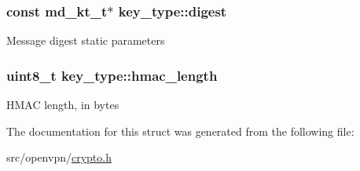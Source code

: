 \subsubsection[{digest}]{\setlength{\rightskip}{0pt plus 5cm}const {\bf md\+\_\+kt\+\_\+t}$\ast$ key\+\_\+type\+::digest}\label{structkey__type_a496ad3263017e1eca30ec7f490a8011e}
Message digest static parameters \hypertarget{structkey__type_a0714213fa1e02f00924a2c85deb53caf}{}
\subsubsection[{hmac\+\_\+length}]{\setlength{\rightskip}{0pt plus 5cm}uint8\+\_\+t key\+\_\+type\+::hmac\+\_\+length}\label{structkey__type_a0714213fa1e02f00924a2c85deb53caf}
H\+M\+A\+C length, in bytes 

The documentation for this struct was generated from the following file\+:\begin{DoxyCompactItemize}
\item 
src/openvpn/\hyperlink{crypto_8h}{crypto.\+h}\end{DoxyCompactItemize}
